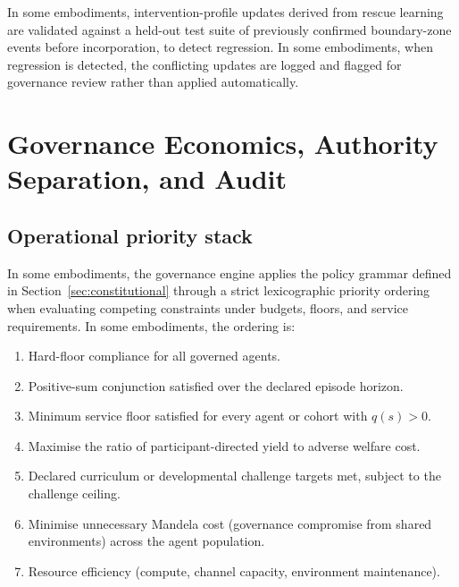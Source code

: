 \documentclass[a4paper,12pt]{article}
\begin{document}
In some embodiments, intervention-profile updates derived from rescue
learning are validated against a held-out test suite of previously
confirmed boundary-zone events before incorporation, to detect
regression. In some embodiments, when regression is detected, the
conflicting updates are logged and flagged for governance review
rather than applied automatically.

\section{Governance Economics, Authority Separation, and Audit}


\subsection{Operational priority stack}
\label{sec:priority-stack}

In some embodiments, the governance engine applies the policy grammar
defined in Section~\ref{sec:constitutional} through a strict
lexicographic priority ordering when evaluating competing constraints
under budgets, floors, and service requirements. In some embodiments,
the ordering is:

\begin{enumerate}
  \item Hard-floor compliance for all governed agents.
  \item Positive-sum conjunction satisfied over the declared episode
    horizon.
  \item Minimum service floor satisfied for every agent or cohort with
    $q(s) > 0$.
  \item Maximise the ratio of participant-directed yield to adverse
    welfare cost.
  \item Declared curriculum or developmental challenge targets met,
    subject to the challenge ceiling.
  \item Minimise unnecessary Mandela cost (governance compromise
    from shared environments) across the agent population.
  \item Resource efficiency (compute, channel capacity, environment
    maintenance).
\end{enumerate}
\end{document}
